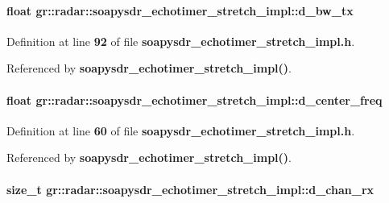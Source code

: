 \paragraph[{d\+\_\+bw\+\_\+tx}]{\setlength{\rightskip}{0pt plus 5cm}float gr\+::radar\+::soapysdr\+\_\+echotimer\+\_\+stretch\+\_\+impl\+::d\+\_\+bw\+\_\+tx\hspace{0.3cm}{\ttfamily [private]}}\label{classgr_1_1radar_1_1soapysdr__echotimer__stretch__impl_ad360eff1cf3f89df95f13ac6a3352ecb}


Definition at line {\bf 92} of file {\bf soapysdr\+\_\+echotimer\+\_\+stretch\+\_\+impl.\+h}.



Referenced by {\bf soapysdr\+\_\+echotimer\+\_\+stretch\+\_\+impl()}.

\paragraph[{d\+\_\+center\+\_\+freq}]{\setlength{\rightskip}{0pt plus 5cm}float gr\+::radar\+::soapysdr\+\_\+echotimer\+\_\+stretch\+\_\+impl\+::d\+\_\+center\+\_\+freq\hspace{0.3cm}{\ttfamily [private]}}\label{classgr_1_1radar_1_1soapysdr__echotimer__stretch__impl_a654566de5f8902f8d0bad903bdce7dd1}


Definition at line {\bf 60} of file {\bf soapysdr\+\_\+echotimer\+\_\+stretch\+\_\+impl.\+h}.



Referenced by {\bf soapysdr\+\_\+echotimer\+\_\+stretch\+\_\+impl()}.

\paragraph[{d\+\_\+chan\+\_\+rx}]{\setlength{\rightskip}{0pt plus 5cm}size\+\_\+t gr\+::radar\+::soapysdr\+\_\+echotimer\+\_\+stretch\+\_\+impl\+::d\+\_\+chan\+\_\+rx\hspace{0.3cm}{\ttfamily [private]}}\label{classgr_1_1radar_1_1soapysdr__echotimer__stretch__impl_ae0daf5547b6db598f6c84866843aa8b3}


